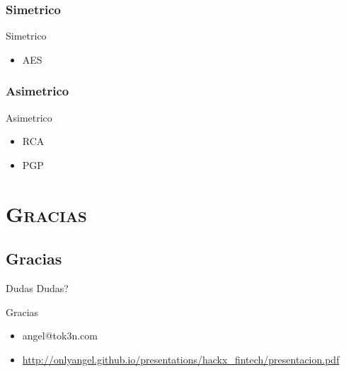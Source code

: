 \documentclass[xcolor=x11names,compress]{beamer}
\renewcommand{\(}{\begin{columns}}
\renewcommand{\)}{\end{columns}}
\newcommand{\<}[1]{\begin{column}{#1}}
\renewcommand{\>}{\end{column}}
\begin{document}
\subsubsection{Simetrico}
\begin{frame}{Simetrico}
    \begin{center}
        \begin{itemize}
            \item AES
        \end{itemize}
    \end{center}

    
\end{frame}

\subsubsection{Asimetrico}
\begin{frame}{Asimetrico}
    \begin{center}
        \begin{itemize}
            \item RCA
            \item PGP
        \end{itemize}
    \end{center}

    
\end{frame}


\section{\scshape Gracias}
\subsection{Gracias}
\begin{frame}{Dudas}
    Dudas?
\end{frame}

\begin{frame}{Gracias}
    \begin{center}
        \begin{itemize}
            \item angel@tok3n.com
            \item \url{http://onlyangel.github.io/presentations/hackx_fintech/presentacion.pdf}
        \end{itemize}
    \end{center}
\end{frame}
\end{document}
